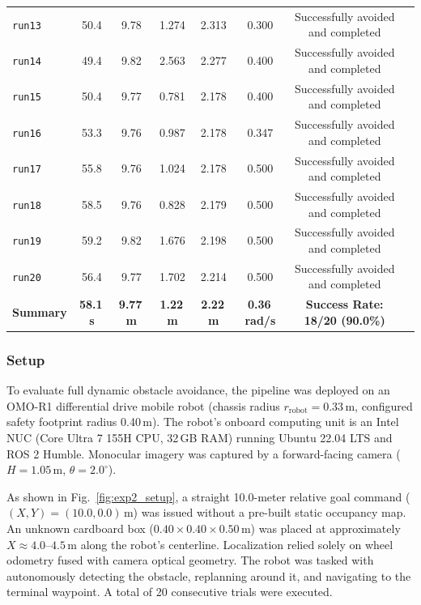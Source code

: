 \documentclass[preprint,12pt]{elsarticle}
\begin{document}
\begin{table}[!t]
\begin{tabularx}{\textwidth}{lccccccX}
    \texttt{run13} & 50.4 & 9.78 & 1.274 & 2.313 & 0.300 & Successfully avoided and completed \\
    \texttt{run14} & 49.4 & 9.82 & 2.563 & 2.277 & 0.400 & Successfully avoided and completed \\
    \texttt{run15} & 50.4 & 9.77 & 0.781 & 2.178 & 0.400 & Successfully avoided and completed \\
    \texttt{run16} & 53.3 & 9.76 & 0.987 & 2.178 & 0.347 & Successfully avoided and completed \\
    \texttt{run17} & 55.8 & 9.76 & 1.024 & 2.178 & 0.500 & Successfully avoided and completed \\
    \texttt{run18} & 58.5 & 9.76 & 0.828 & 2.179 & 0.500 & Successfully avoided and completed \\
    \texttt{run19} & 59.2 & 9.82 & 1.676 & 2.198 & 0.500 & Successfully avoided and completed \\
    \texttt{run20} & 56.4 & 9.77 & 1.702 & 2.214 & 0.500 & Successfully avoided and completed \\
    \midrule
    \textbf{Summary} & \textbf{58.1\,s} & \textbf{9.77\,m} & \textbf{1.22\,m} & \textbf{2.22\,m} & \textbf{0.36\,rad/s} & \textbf{Success Rate: 18/20 (90.0\%)} \\
    \bottomrule
  \end{tabularx}
\end{table}

\subsubsection{Setup}
To evaluate full dynamic obstacle avoidance, the pipeline was deployed on an OMO-R1 differential drive mobile robot (chassis radius $r_{\mathrm{robot}} = 0.33$\,m, configured safety footprint radius 0.40\,m). The robot's onboard computing unit is an Intel NUC (Core Ultra 7 155H CPU, 32\,GB RAM) running Ubuntu 22.04 LTS and ROS 2 Humble. Monocular imagery was captured by a forward-facing camera ($H=1.05$\,m, $\theta=2.0^\circ$).

As shown in Fig.~\ref{fig:exp2_setup}, a straight 10.0-meter relative goal command ($(X, Y) = (10.0, 0.0)$\,m) was issued without a pre-built static occupancy map. An unknown cardboard box ($0.40 \times 0.40 \times 0.50$\,m) was placed at approximately $X \approx 4.0\text{--}4.5$\,m along the robot's centerline. Localization relied solely on wheel odometry fused with camera optical geometry. The robot was tasked with autonomously detecting the obstacle, replanning around it, and navigating to the terminal waypoint. A total of 20 consecutive trials were executed.
\end{document}
